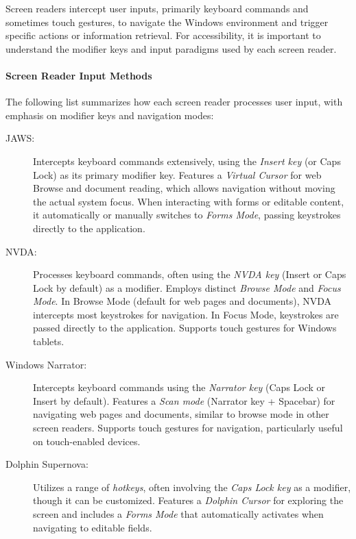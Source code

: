 Screen readers intercept user inputs, primarily keyboard commands and sometimes touch gestures, to navigate the Windows environment and trigger specific actions or information retrieval. For accessibility, it is important to understand the modifier keys and input paradigms used by each screen reader.

\paragraph{Screen Reader Input Methods}
The following list summarizes how each screen reader processes user input, with emphasis on modifier keys and navigation modes:

\begin{description}
    \item[JAWS:] Intercepts keyboard commands extensively, using the \emph{Insert key} (or Caps Lock) as its primary modifier key. \cite{JAWSBasicCommands} Features a \emph{Virtual Cursor} for web Browse and document reading, which allows navigation without moving the actual system focus. When interacting with forms or editable content, it automatically or manually switches to \emph{Forms Mode}, passing keystrokes directly to the application. \cite{JAWSKeyboardGestures}
    \item[NVDA:] Processes keyboard commands, often using the \emph{NVDA key} (Insert or Caps Lock by default) as a modifier. \cite{NVDAKeyboardCommands} Employs distinct \emph{Browse Mode} and \emph{Focus Mode}. In Browse Mode (default for web pages and documents), NVDA intercepts most keystrokes for navigation. In Focus Mode, keystrokes are passed directly to the application. Supports touch gestures for Windows tablets. \cite{NVDAKeyboardCommands}
    \item[Windows Narrator:] Intercepts keyboard commands using the \emph{Narrator key} (Caps Lock or Insert by default). \cite{NarratorKeyboardCommands} Features a \emph{Scan mode} (Narrator key + Spacebar) for navigating web pages and documents, similar to browse mode in other screen readers. Supports touch gestures for navigation, particularly useful on touch-enabled devices. \cite{NarratorGuide}
    \item[Dolphin Supernova:] Utilizes a range of \emph{hotkeys}, often involving the \emph{Caps Lock key} as a modifier, though it can be customized. \cite{SuperNovaHotkeys} Features a \emph{Dolphin Cursor} for exploring the screen and includes a \emph{Forms Mode} that automatically activates when navigating to editable fields. \cite{SuperNovaHotkeys}
\end{description}

